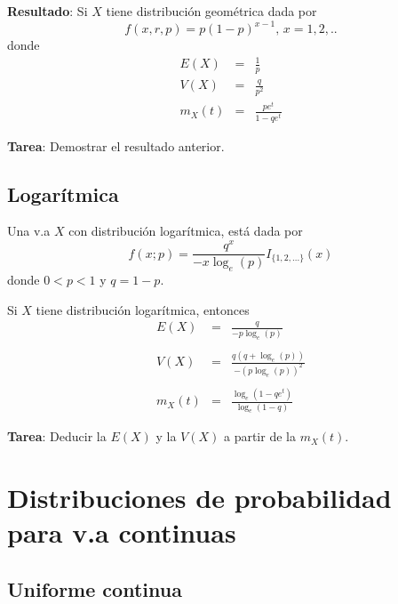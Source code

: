 \begin{i}
\textbf{Resultado}: Si $X$ tiene distribución geométrica dada por
\begin{equation*}
f(x,r,p)=p(1-p)^{x-1}\text{, \ \ \ }x=1,2,..
\end{equation*}%
donde
\begin{eqnarray*}
E(X) &=&\frac{1}{p} \\
V(X) &=&\frac{q}{p^{2}} \\
m_{X}(t) &=&\frac{pe^{t}}{1-qe^{t}}
\end{eqnarray*}

\textbf{Tarea}: Demostrar el resultado anterior.


\subsection{Logarítmica}

\begin{definition}
Una v.a $X$ con distribución logarítmica, está dada  por 
\begin{equation*}
f(x;p)=\frac{q^{x}}{-x\log _{e}(p)}I_{\{1,2,...\}}(x)
\end{equation*}%
donde $0<p<1$ y $q=1-p.$
\end{definition}

\begin{theorem}
 Si $X$ tiene distribución logarítmica, entonces
\begin{eqnarray*}
E(X) &=&\frac{q}{-p\log _{e}(p)} \\
&& \\
V(X) &=&\frac{q(q+\log _{e}(p))}{-(p\log _{e}(p))^{2}} \\
&& \\
m_{X}(t) &=&\frac{\log _{e}(1-qe^{t})}{\log _{e}(1-q)}
\end{eqnarray*}
\end{theorem}


\textbf{Tarea}: Deducir la $E(X)$ y la $V(X)$ a partir de la $m_{X}(t)$.


\section{Distribuciones de probabilidad para v.a continuas}


\subsection{Uniforme continua}


\end{i}
